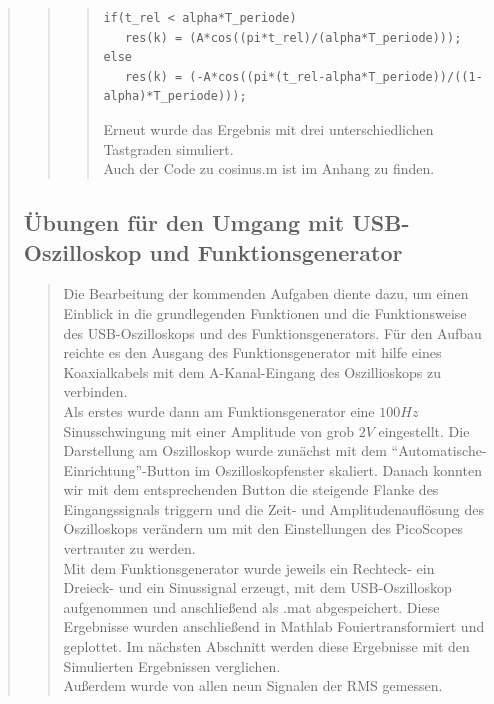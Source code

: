 \begin{quote}
\begin{quote}
\begin{quote}
\begin{lstlisting}
if(t_rel < alpha*T_periode)
   res(k) = (A*cos((pi*t_rel)/(alpha*T_periode)));
else
   res(k) = (-A*cos((pi*(t_rel-alpha*T_periode))/((1-alpha)*T_periode)));
\end{lstlisting} 
            
                Erneut wurde das Ergebnis mit drei unterschiedlichen Tastgraden simuliert.\\
                
                Auch der Code zu cosinus.m ist im Anhang zu finden.\\
                
            \end{quote}
        \end{quote}
        
    \subsection{Übungen für den Umgang mit USB-Oszilloskop und Funktionsgenerator}  
    \begin{quote}
    
    Die Bearbeitung der kommenden Aufgaben diente dazu, um einen Einblick in die
    grundlegenden Funktionen und die Funktionsweise des USB-Oszilloskops und des
    Funktionsgenerators. Für den Aufbau reichte es den Ausgang des
    Funktionsgenerator mit hilfe eines Koaxialkabels mit dem A-Kanal-Eingang des Oszillioskops 
    zu verbinden.\\
    
    Als erstes wurde dann am Funktionsgenerator eine $100 Hz$
    Sinusschwingung mit einer Amplitude von grob $2V$ eingestellt. Die Darstellung am
    Oszilloskop wurde zunächst mit dem ``Automatische-Einrichtung''-Button im
    Oszilloskopfenster skaliert. Danach konnten wir mit dem entsprechenden Button
    die steigende Flanke des Eingangssignals triggern und die Zeit- und
    Amplitudenauflösung des Oszilloskops verändern um mit den Einstellungen des
    PicoScopes vertrauter zu werden.\\
    
    Mit dem Funktionsgenerator wurde jeweils ein Rechteck- ein Dreieck- und ein Sinussignal erzeugt, mit dem
    USB-Oszilloskop aufgenommen und anschließend als .mat abgespeichert. Diese Ergebnisse wurden anschließend in Mathlab
    Fouiertransformiert und geplottet. Im nächsten Abschnitt werden diese Ergebnisse mit den Simulierten Ergebnissen
    verglichen.\\
    
    Außerdem wurde von allen neun Signalen der RMS gemessen. 
    
    
    \end{quote}     
\begin{quote}       
\end{quote} 


\end{quote}
    
